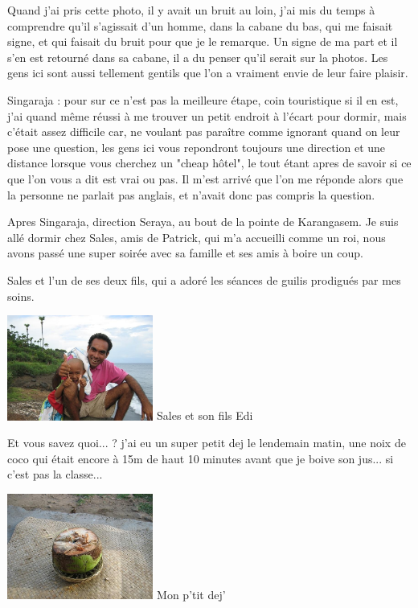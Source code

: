 \begin{multicols}{2}
Quand j'ai pris cette photo, il y avait un bruit au loin, j'ai mis du temps à comprendre qu'il s'agissait d'un homme, dans la cabane du bas, qui me faisait signe, et qui faisait du bruit pour que je le remarque. Un signe de ma part et il s'en est retourné dans sa cabane, il a du penser qu'il serait sur la photos. Les gens ici sont aussi tellement gentils que l'on a vraiment envie de leur faire plaisir.

Singaraja : pour sur ce n'est pas la meilleure étape, coin touristique si il en est, j'ai quand même réussi à me trouver un petit endroit à l'écart pour dormir, mais c'était assez difficile car, ne voulant pas paraître comme ignorant quand on leur pose une question, les gens ici vous repondront toujours une direction et une distance lorsque vous cherchez un "cheap hôtel", le tout étant apres de savoir si ce que l'on vous a dit est vrai ou pas. Il m'est arrivé que l'on me réponde alors que la personne ne parlait pas anglais, et n'avait donc pas compris la question.

Apres Singaraja, direction Seraya, au bout de la pointe de Karangasem. Je suis allé dormir chez Sales, amis de Patrick, qui m'a accueilli comme un roi, nous avons passé une super soirée avec sa famille et ses amis à boire un coup.

Sales et l'un de ses deux fils, qui a adoré les séances de guilis prodigués par mes soins.

\hspace*{-0.65cm}
\includegraphics[width=4.8cm]{articles/Round-trip-in-bali/1208257303gr5r.jpg}
Sales et son fils Edi


Et vous savez quoi... ? j'ai eu un super petit dej le lendemain matin, une noix de coco qui était encore à 15m de haut 10 minutes avant que je boive son jus... si c'est pas la classe...

\hspace*{-0.65cm}
\includegraphics[width=4.8cm]{articles/Round-trip-in-bali/1208257299a93l.jpg}
Mon p'tit dej'



\end{multicols}
